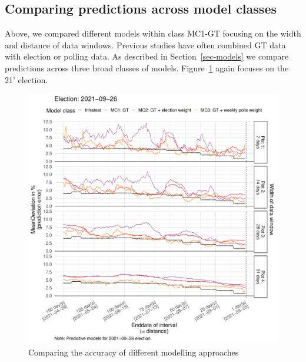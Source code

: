 \documentclass[
  letterpaper,
  DIV=11,
  numbers=noendperiod]{scrartcl}
\begin{document}
\hypertarget{comparing-predictions-across-model-classes}{%
\subsection{Comparing predictions across model
classes}\label{comparing-predictions-across-model-classes}}

Above, we compared different models within class MC1-GT focusing on the
width and distance of data windows. Previous studies have often combined
GT data with election or polling data. As described in
Section~\ref{sec-models} we compare predictions across three broad
classes of models. Figure~\ref{fig-5} again focuses on the 21' election.

\begin{figure}[H]

\caption{\label{fig-5}Comparing the accuracy of different modelling
approaches}

{\centering \includegraphics{figures/fig-5-1.pdf}

}

\end{figure}
\end{document}
